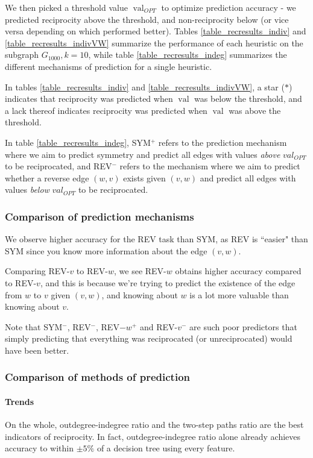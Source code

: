 \documentclass[conference]{IEEEtran}
\begin{document}
We then picked a threshold value $\operatorname{val}_{OPT}$ to optimize prediction accuracy - we predicted reciprocity above the threshold, and non-reciprocity below (or vice versa depending on which performed better). Tables \ref{table_recresults_indiv} and \ref{table_recresults_indivVW} summarize the performance of each heuristic on the subgraph $G_{1000}, k=10$, while table \ref{table_recresults_indeg} summarizes the different mechanisms of prediction for a single heuristic.

In tables \ref{table_recresults_indiv} and \ref{table_recresults_indivVW}, a star ($*$) indicates that reciprocity was predicted when $\operatorname{val}$ was below the threshold, and a lack thereof indicates reciprocity was predicted when $\operatorname{val}$ was above the threshold.

In table \ref{table_recresults_indeg}, SYM$^+$ refers to the prediction mechanism where we aim to predict symmetry and predict all edges with values \emph{above} $val_{OPT}$ to be reciprocated, and REV$^-$ refers to the mechanism where we aim to predict whether a reverse edge $(w,v)$ exists given $(v,w)$ and predict all edges with values \emph{below} $val_{OPT}$ to be reciprocated. 

\subsubsection{Comparison of prediction mechanisms}
We observe higher accuracy for the REV task than SYM, as REV is ``easier" than SYM since you know more information about the edge $(v,w)$.

Comparing REV-$v$ to REV-$w$, we see REV-$w$ obtains higher accuracy compared to REV-$v$, and this is because we're trying to predict the existence of the edge from $w$ to $v$ given $(v,w)$, and knowing about $w$ is a lot more valuable than knowing about $v$.

Note that SYM$^-$, REV$^-$, REV$-w^+$ and REV-$v^-$ are such poor predictors that simply predicting that everything was reciprocated (or unreciprocated) would have been better.

\subsubsection{Comparison of methods of prediction}

\paragraph{Trends}
On the whole, outdegree-indegree ratio and the two-step paths ratio are the best indicators of reciprocity. In fact, outdegree-indegree ratio alone already achieves accuracy to within $\pm 5\%$ of a decision tree using every feature.
\end{document}
